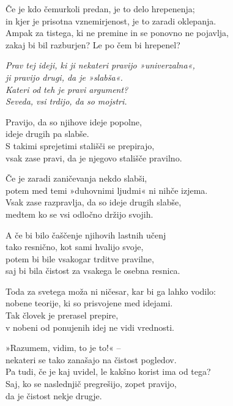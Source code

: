 Če je kdo čemurkoli predan, je to delo hrepenenja;\\
in kjer je prisotna vznemirjenost, je to zaradi oklepanja.\\
Ampak za tistega, ki ne premine in se ponovno ne pojavlja,\\
zakaj bi bil razburjen? Le po čem bi hrepenel?

\emph{Prav tej ideji, ki ji nekateri pravijo »univerzalna«,}\\
\emph{ji pravijo drugi, da je »slabša«.}\\
\emph{Kateri od teh je pravi argument?}\\
\emph{Seveda, vsi trdijo, da so mojstri.}

Pravijo, da so njihove ideje popolne,\\
ideje drugih pa slabše.\\
S takimi sprejetimi stališči se prepirajo,\\
vsak zase pravi, da je njegovo stališče pravilno.

Če je zaradi zaničevanja nekdo slabši,\\
potem med temi »duhovnimi ljudmi« ni nihče izjema.\\
Vsak zase razpravlja, da so ideje drugih slabše,\\
medtem ko se vsi odločno držijo svojih.

A če bi bilo čaščenje njihovih lastnih učenj\\
tako resnično, kot sami hvalijo svoje,\\
potem bi bile vsakogar trditve pravilne,\\
saj bi bila čistost za vsakega le osebna resnica.

Toda za svetega moža ni ničesar, kar bi ga lahko vodilo:\\
nobene teorije, ki so prisvojene med idejami.\\
Tak človek je prerasel prepire,\\
v nobeni od ponujenih idej ne vidi vrednosti.

»Razumem, vidim, to je to!« --\\
nekateri se tako zanašajo na čistost pogledov.\\
Pa tudi, če je kaj uvidel, le kakšno korist ima od tega?\\
Saj, ko se naslednjič pregrešijo, zopet pravijo,\\\vin da je čistost nekje drugje.

